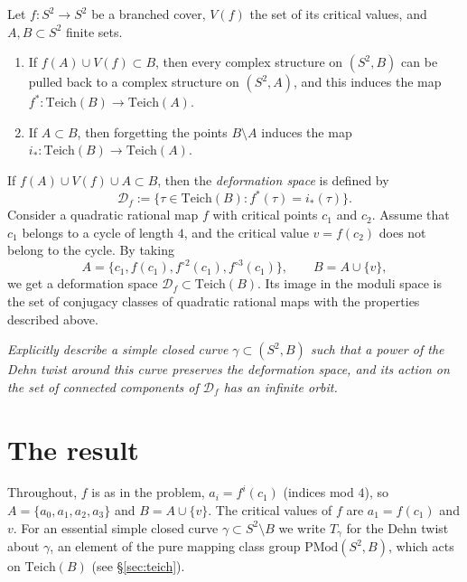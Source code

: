 \documentclass[11pt]{article}
\theoremstyle{definition}
\newcommand{\Teich}{\mathrm{Teich}}
\newcommand{\PMod}{\mathrm{PMod}}
\newcommand{\D}{\mathcal D}
\begin{document}
Let $f\colon S^2\to S^2$ be a branched cover, $V(f)$ the set of its critical values, and $A,B\subset S^2$ finite sets.
\begin{enumerate}
\item If $f(A)\cup V(f)\subset B$, then every complex structure on $(S^2,B)$ can be pulled back to a complex structure on $(S^2,A)$, and this induces the map $f^*\colon\Teich(B)\to\Teich(A)$.
\item If $A\subset B$, then forgetting the points $B\setminus A$ induces the map $i_*\colon\Teich(B)\to\Teich(A)$.
\end{enumerate}
If $f(A)\cup V(f)\cup A\subset B$, then the \emph{deformation space} is defined by
\[\D_f:=\{\tau\in\Teich(B): f^*(\tau)=i_*(\tau)\}.\]
Consider a quadratic rational map $f$ with critical points $c_1$ and $c_2$. Assume that $c_1$ belongs to a cycle of length $4$, and the critical value $v=f(c_2)$ does not belong to the cycle. By taking
\[A=\{c_1,f(c_1),f^{\circ2}(c_1),f^{\circ3}(c_1)\},\qquad B=A\cup\{v\},\]
we get a deformation space $\D_f\subset\Teich(B)$. Its image in the moduli space is the set of conjugacy classes of quadratic rational maps with the properties described above.

\emph{Explicitly describe a simple closed curve $\gamma\subset(S^2,B)$ such that a power of the Dehn twist around this curve preserves the deformation space, and its action on the set of connected components of $\D_f$ has an infinite orbit.}

\section{The result}

Throughout, $f$ is as in the problem, $a_i=f^{i}(c_1)$ (indices mod $4$), so $A=\{a_0,a_1,a_2,a_3\}$ and $B=A\cup\{v\}$. The critical values of $f$ are $a_1=f(c_1)$ and $v$. For an essential simple closed curve $\gamma\subset S^2\setminus B$ we write $T_\gamma$ for the Dehn twist about $\gamma$, an element of the pure mapping class group $\PMod(S^2,B)$, which acts on $\Teich(B)$ (see \S\ref{sec:teich}).
\end{document}
